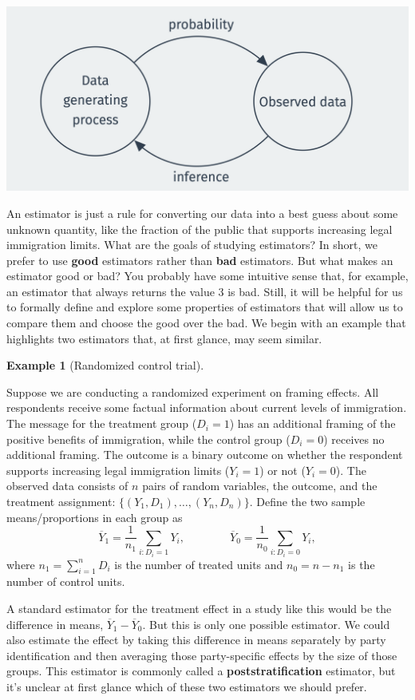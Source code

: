 \documentclass[
  letterpaper,
  DIV=11,
  numbers=noendperiod]{scrreprt}
\newcommand{\Ybar}{\overline{Y}}
\theoremstyle{definition}
\newtheorem{example}{Example}[chapter]
\theoremstyle{definition}
\theoremstyle{plain}
\theoremstyle{remark}
\begin{document}
\includegraphics{assets/img/two-direction.png}

An estimator is just a rule for converting our data into a best guess
about some unknown quantity, like the fraction of the public that
supports increasing legal immigration limits. What are the goals of
studying estimators? In short, we prefer to use \textbf{good} estimators
rather than \textbf{bad} estimators. But what makes an estimator good or
bad? You probably have some intuitive sense that, for example, an
estimator that always returns the value 3 is bad. Still, it will be
helpful for us to formally define and explore some properties of
estimators that will allow us to compare them and choose the good over
the bad. We begin with an example that highlights two estimators that,
at first glance, may seem similar.

\begin{example}[Randomized control
trial]\protect\hypertarget{exm-rct}{}\label{exm-rct}

Suppose we are conducting a randomized experiment on framing effects.
All respondents receive some factual information about current levels of
immigration. The message for the treatment group (\(D_i = 1\)) has an
additional framing of the positive benefits of immigration, while the
control group (\(D_i = 0\)) receives no additional framing. The outcome
is a binary outcome on whether the respondent supports increasing legal
immigration limits (\(Y_i = 1\)) or not (\(Y_i = 0\)). The observed data
consists of \(n\) pairs of random variables, the outcome, and the
treatment assignment: \(\{(Y_1, D_1), \ldots, (Y_n, D_n)\}\). Define the
two sample means/proportions in each group as \[
\Ybar_1 = \frac{1}{n_1} \sum_{i: D_i = 1} Y_i, \qquad\qquad \Ybar_0 = \frac{1}{n_0} \sum_{i: D_i = 0} Y_i,
\] where \(n_1 = \sum_{i=1}^n D_i\) is the number of treated units and
\(n_0 = n - n_1\) is the number of control units.

A standard estimator for the treatment effect in a study like this would
be the difference in means, \(\Ybar_1 - \Ybar_0\). But this is only one
possible estimator. We could also estimate the effect by taking this
difference in means separately by party identification and then
averaging those party-specific effects by the size of those groups. This
estimator is commonly called a \textbf{poststratification} estimator,
but it's unclear at first glance which of these two estimators we should
prefer.

\end{example}
\end{document}
